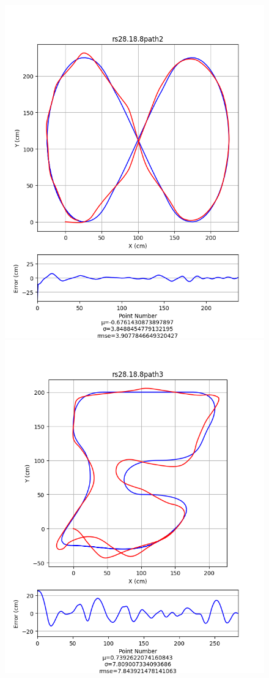 \documentclass[mla8alt]{mla}
\begin{document}
\begin{paper}
\begin{figure}[H]
\includegraphics[width=\linewidth]{pathData/rspath2}
\endminipage\\
\includegraphics[width=\linewidth]{pathData/rspath3}

\end{figure}
\end{paper}
\end{document}
